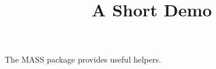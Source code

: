 \documentclass[article]{jss}
\title{A Short Demo}
\begin{document}
The MASS package provides useful helpers.
\end{document}
